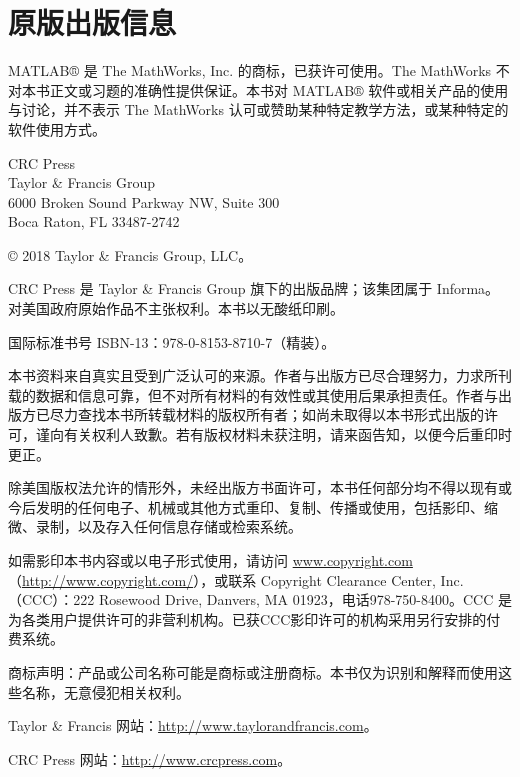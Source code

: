 \chapter*{原版出版信息}
\begingroup\small
MATLAB® 是 The MathWorks, Inc. 的商标，已获许可使用。The MathWorks 不对本书正文或习题的准确性提供保证。本书对 MATLAB® 软件或相关产品的使用与讨论，并不表示 The MathWorks 认可或赞助某种特定教学方法，或某种特定的软件使用方式。

\begin{flushleft}
CRC Press\\
Taylor \& Francis Group\\
6000 Broken Sound Parkway NW, Suite 300\\
Boca Raton, FL 33487-2742
\end{flushleft}
© 2018 Taylor \& Francis Group, LLC。

CRC Press 是 Taylor \& Francis Group 旗下的出版品牌；该集团属于 Informa。对美国政府原始作品不主张权利。本书以无酸纸印刷。

国际标准书号 ISBN-13：978-0-8153-8710-7（精装）。

本书资料来自真实且受到广泛认可的来源。作者与出版方已尽合理努力，力求所刊载的数据和信息可靠，但不对所有材料的有效性或其使用后果承担责任。作者与出版方已尽力查找本书所转载材料的版权所有者；如尚未取得以本书形式出版的许可，谨向有关权利人致歉。若有版权材料未获注明，请来函告知，以便今后重印时更正。

除美国版权法允许的情形外，未经出版方书面许可，本书任何部分均不得以现有或今后发明的任何电子、机械或其他方式重印、复制、传播或使用，包括影印、缩微、录制，以及存入任何信息存储或检索系统。

如需影印本书内容或以电子形式使用，请访问 \url{www.copyright.com}（\url{http://www.copyright.com/}），或联系 Copyright Clearance Center, Inc.（CCC）：222 Rosewood Drive, Danvers, MA 01923，电话978-750-8400。CCC 是为各类用户提供许可的非营利机构。已获CCC影印许可的机构采用另行安排的付费系统。

商标声明：产品或公司名称可能是商标或注册商标。本书仅为识别和解释而使用这些名称，无意侵犯相关权利。

Taylor \& Francis 网站：\url{http://www.taylorandfrancis.com}。

CRC Press 网站：\url{http://www.crcpress.com}。
\endgroup
